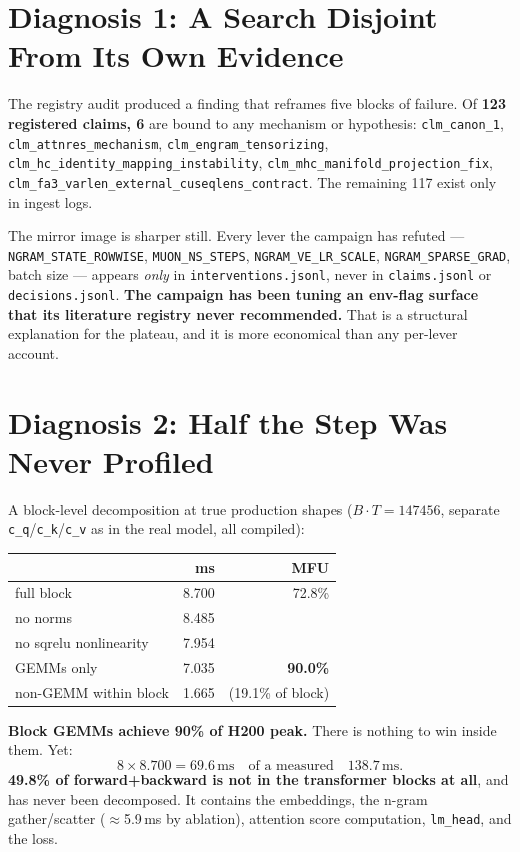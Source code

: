 \documentclass{article}
\begin{document}
\section{Diagnosis 1: A Search Disjoint From Its Own Evidence}
The registry audit produced a finding that reframes five blocks of failure. Of \textbf{123 registered claims, 6} are bound to any mechanism or hypothesis: \texttt{clm\_canon\_1}, \texttt{clm\_attnres\_mechanism}, \texttt{clm\_engram\_tensorizing}, \texttt{clm\_hc\_identity\_mapping\_instability}, \texttt{clm\_mhc\_manifold\_projection\_fix}, \texttt{clm\_fa3\_varlen\_external\_cuseqlens\_contract}. The remaining 117 exist only in ingest logs.

The mirror image is sharper still. Every lever the campaign has refuted --- \texttt{NGRAM\_STATE\_ROWWISE}, \texttt{MUON\_NS\_STEPS}, \texttt{NGRAM\_VE\_LR\_SCALE}, \texttt{NGRAM\_SPARSE\_GRAD}, batch size --- appears \emph{only} in \texttt{interventions.jsonl}, never in \texttt{claims.jsonl} or \texttt{decisions.jsonl}. \textbf{The campaign has been tuning an env-flag surface that its literature registry never recommended.} That is a structural explanation for the plateau, and it is more economical than any per-lever account.

\section{Diagnosis 2: Half the Step Was Never Profiled}
A block-level decomposition at true production shapes ($B{\cdot}T = 147456$, separate \texttt{c\_q}/\texttt{c\_k}/\texttt{c\_v} as in the real model, all compiled):

\begin{center}\begin{small}
\begin{tabular}{lrr}
\toprule
 & ms & MFU \\
\midrule
full block & 8.700 & 72.8\% \\
\quad no norms & 8.485 & \\
\quad no sqrelu nonlinearity & 7.954 & \\
\quad GEMMs only & 7.035 & \textbf{90.0\%} \\
\midrule
non-GEMM within block & 1.665 & (19.1\% of block) \\
\bottomrule
\end{tabular}
\end{small}\end{center}

\textbf{Block GEMMs achieve 90\% of H200 peak.} There is nothing to win inside them. Yet:
\[
8 \times 8.700 = 69.6\,\mathrm{ms} \quad\text{of a measured}\quad 138.7\,\mathrm{ms}.
\]
\textbf{49.8\% of forward+backward is not in the transformer blocks at all}, and has never been decomposed. It contains the embeddings, the n-gram gather/scatter ($\approx$5.9\,ms by ablation), attention score computation, \texttt{lm\_head}, and the loss.
\end{document}
